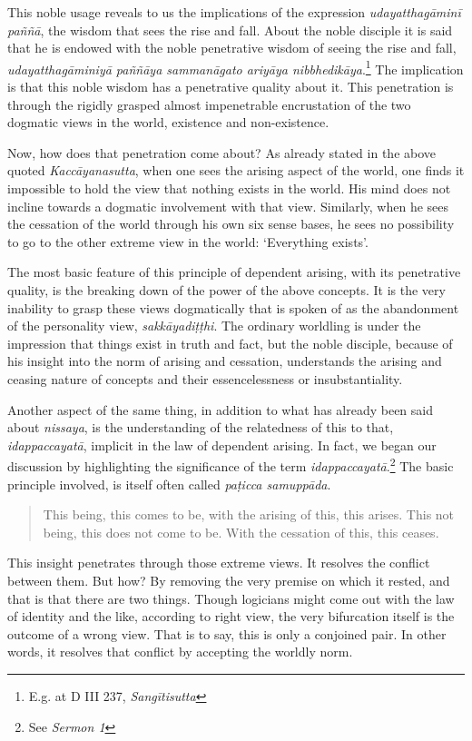 This noble usage reveals to us the implications of the expression \emph{udayatthagāminī paññā}, the wisdom that sees the rise and fall. About the noble disciple it is said that he is endowed with the noble penetrative wisdom of seeing the rise and fall, \emph{udayatthagāminiyā paññāya sammanāgato ariyāya nibbhedikāya}.\footnote{E.g. at D III 237, \emph{Sangītisutta}} The implication is that this noble wisdom has a penetrative quality about it. This penetration is through the rigidly grasped almost impenetrable encrustation of the two dogmatic views in the world, existence and non-existence.

Now, how does that penetration come about? As already stated in the above quoted \emph{Kaccāyanasutta}, when one sees the arising aspect of the world, one finds it impossible to hold the view that nothing exists in the world. His mind does not incline towards a dogmatic involvement with that view. Similarly, when he sees the cessation of the world through his own six sense bases, he sees no possibility to go to the other extreme view in the world: `Everything exists'.

The most basic feature of this principle of dependent arising, with its penetrative quality, is the breaking down of the power of the above concepts. It is the very inability to grasp these views dogmatically that is spoken of as the abandonment of the personality view, \emph{sakkāyadiṭṭhi}. The ordinary worldling is under the impression that things exist in truth and fact, but the noble disciple, because of his insight into the norm of arising and cessation, understands the arising and ceasing nature of concepts and their essencelessness or insubstantiality.

Another aspect of the same thing, in addition to what has already been said about \emph{nissaya}, is the understanding of the relatedness of this to that, \emph{idappaccayatā}, implicit in the law of dependent arising. In fact, we began our discussion by highlighting the significance of the term \emph{idappaccayatā}.\footnote{See \emph{Sermon 1}} The basic principle involved, is itself often called \emph{paṭicca samuppāda}.

\begin{quote}
This being, this comes to be, with the arising of this, this arises. This not being, this does not come to be. With the cessation of this, this ceases.
\end{quote}

This insight penetrates through those extreme views. It resolves the conflict between them. But how? By removing the very premise on which it rested, and that is that there are two things. Though logicians might come out with the law of identity and the like, according to right view, the very bifurcation itself is the outcome of a wrong view. That is to say, this is only a conjoined pair. In other words, it resolves that conflict by accepting the worldly norm.

